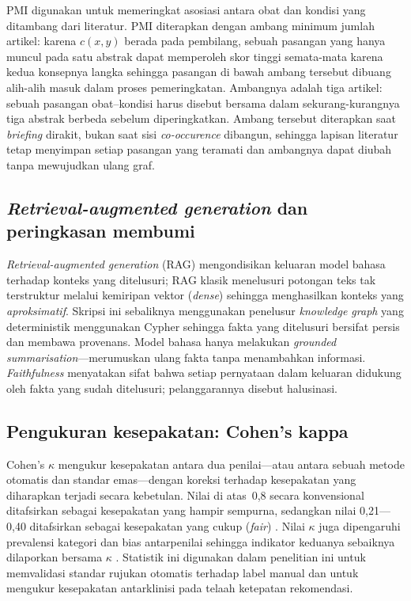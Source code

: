 PMI digunakan untuk memeringkat asosiasi antara obat dan kondisi yang ditambang dari literatur. PMI
diterapkan dengan ambang minimum jumlah artikel: karena $c(x,y)$ berada pada pembilang, sebuah
pasangan yang hanya muncul pada satu abstrak dapat memperoleh skor tinggi semata-mata karena
kedua konsepnya langka sehingga pasangan di bawah ambang tersebut dibuang alih-alih
masuk dalam proses pemeringkatan. Ambangnya adalah tiga artikel: sebuah pasangan obat--kondisi harus disebut
bersama dalam sekurang-kurangnya tiga abstrak berbeda sebelum diperingkatkan. Ambang
tersebut diterapkan saat \emph{briefing} dirakit, bukan saat sisi \emph{co-occurence} dibangun,
sehingga lapisan literatur tetap menyimpan setiap pasangan yang teramati dan ambangnya dapat
diubah tanpa mewujudkan ulang graf.

\subsection{\emph{Retrieval-augmented generation} dan peringkasan membumi}
\emph{Retrieval-augmented generation} (RAG) \cite{rag_lewis2020} mengondisikan keluaran model
bahasa terhadap konteks yang ditelusuri; RAG klasik menelusuri potongan teks tak terstruktur
melalui kemiripan vektor (\emph{dense}) sehingga menghasilkan konteks yang
\emph{aproksimatif}. Skripsi ini sebaliknya menggunakan penelusur \emph{knowledge graph} yang
deterministik menggunakan Cypher sehingga fakta yang ditelusuri bersifat persis dan membawa provenans. Model bahasa hanya melakukan \emph{grounded summarisation}---merumuskan ulang fakta tanpa
menambahkan informasi. \emph{Faithfulness} menyatakan sifat bahwa setiap pernyataan dalam
keluaran didukung oleh fakta yang sudah ditelusuri; pelanggarannya disebut halusinasi.

\subsection{Pengukuran kesepakatan: Cohen's kappa}
Cohen's $\kappa$ \cite{cohen1960} mengukur kesepakatan antara dua penilai---atau antara sebuah
metode otomatis dan standar emas---dengan koreksi terhadap kesepakatan yang diharapkan terjadi
secara kebetulan. Nilai di atas~0,8 secara konvensional ditafsirkan sebagai kesepakatan yang
hampir sempurna, sedangkan nilai 0,21---0,40 ditafsirkan sebagai kesepakatan yang cukup
(\emph{fair}) \cite{landis1977}. Nilai $\kappa$ juga dipengaruhi prevalensi kategori dan bias
antarpenilai sehingga indikator keduanya sebaiknya dilaporkan bersama $\kappa$
\cite{byrt1993}. Statistik ini digunakan dalam penelitian ini untuk memvalidasi standar
rujukan otomatis terhadap label manual dan untuk mengukur kesepakatan antarklinisi pada
telaah ketepatan rekomendasi.

